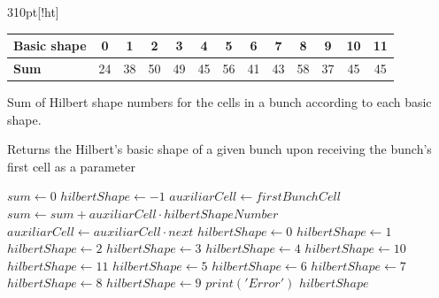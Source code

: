 \begin{acmtable}{310pt}[!ht]
    \begin{center}
        \begin{tabular}{|l|c|c|c|c|c|c|c|c|c|c|c|c|}
            \hline
               \textbf{Basic shape} & 0 & 1 & 2 & 3 & 4 & 5 & 6 & 7 & 8 & 9 & 10 & 11 \\
            \hline
               \textbf{Sum} & 24 & 38 & 50 & 49 & 45 & 56 & 41 & 43 & 58 & 37 & 45 & 45 \\
            \hline
        \end{tabular}
    \end{center}
    \caption{Sum of Hilbert shape numbers for the cells in a bunch according to each basic shape.}
    \label{TAB_IDENTIFICATION_OF_HILBERT_SHAPE_FATHER}
\end{acmtable}

\begin{algorithm}[!ht]
    \caption{Returns the Hilbert's basic shape of a given bunch upon receiving the bunch's first cell as a parameter}
    \small{
    \begin{algorithmic}[1]
            \State $sum \gets 0$
            \State $hilbertShape \gets -1$
            \State $auxiliarCell \gets firstBunchCell$
            \State
                \State $sum \gets sum + auxiliarCell \cdot hilbertShapeNumber$
                \State $auxiliarCell \gets auxiliarCell \cdot next$
            \EndFor
            \State
                \State $hilbertShape \gets 0$
                \State $hilbertShape \gets 1$
                \State $hilbertShape \gets 2$
                \State $hilbertShape \gets 3$
                    \State $hilbertShape \gets 4$
                    \State $hilbertShape \gets 10$
                \Else
                    \State $hilbertShape \gets 11$
                \EndIf
                \State $hilbertShape \gets 5$
                \State $hilbertShape \gets 6$
                \State $hilbertShape \gets 7$
                \State $hilbertShape \gets 8$
                \State $hilbertShape \gets 9$
            \Else
                \State $print('Error')$
            \EndIf
            \State
            \Return $hilbertShape$
        \EndProcedure
    \end{algorithmic} \label{FATHER_HILBERT_SHAPE_PROCEDURE}
    }
\end{algorithm}
